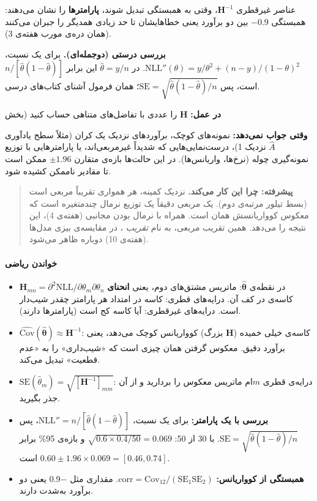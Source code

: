 عناصر غیرقطری \(\mathbf{H}^{-1}\)، وقتی به همبستگی تبدیل شوند،
\textbf{ پارامترها} را نشان می‌دهند: همبستگی 0.9\ensuremath{-} بین دو
برآورد یعنی خطاهایشان تا حد زیادی همدیگر را جبران می‌کنند (همان دره‌ی مورب
هفته‌ی 3).

\textbf{بررسی درستی (دوجمله‌ای).} برای یک نسبت،
\(\mathrm{NLL}''(\theta) = y/\theta^2 + (n-y)/(1-\theta)^2\). در
\(\hat\theta = y/n\) این برابر \(n / [\hat\theta(1-\hat\theta)]\) است،
پس \(\mathrm{SE} = \sqrt{\hat\theta(1-\hat\theta)/n}\)؛ همان فرمول آشنای
کتاب‌های درسی.

\textbf{در عمل:} \(\mathbf{H}\) را عددی با تفاضل‌های متناهی حساب کنید
(بخش 

\textbf{وقتی  جواب نمی‌دهد:} نمونه‌های کوچک، برآوردهای نزدیک یک
کران (مثلاً سطح یادآوری \(\hat A\) نزدیک 1)، درست‌نمایی‌هایی که شدیداً
غیرمربعی‌اند، یا پارامترهایی با توزیع نمونه‌گیری چوله (نرخ‌ها، واریانس‌ها).
در این حالت‌ها بازه‌ی متقارن \(\pm 1.96\)  ممکن است تا مقادیر
ناممکن کشیده شود.

\begin{quote}
\textbf{پیشرفته: چرا این کار می‌کند.} نزدیک کمینه، هر  همواری
تقریباً مربعی است (بسط تیلور مرتبه‌ی دوم). یک  مربعی دقیقاً
 یک توزیع نرمال چندمتغیره است که معکوس کوواریانسش همان
 است. همراه با نرمال بودن مجانبی  (هفته‌ی 4)، این
نتیجه را می‌دهد. همین تقریب مربعی، به نام \emph{تقریب }، در
مقایسه‌ی بیزی مدل‌ها (هفته‌ی 10) دوباره ظاهر می‌شود.
\end{quote}

\paragraph{خواندن ریاضی}

\begin{itemize}
\tightlist
\item
  \(\mathbf{H}_{mn} = \partial^2 \mathrm{NLL}/\partial\theta_m\partial\theta_n\)
  در نقطه‌ی \(\hat{\boldsymbol\theta}\): ماتریس مشتق‌های دوم، یعنی
  \textbf{انحنای} کاسه‌ی  در کف آن. درایه‌های قطری: کاسه در امتداد
  هر پارامتر چقدر شیب‌دار است. درایه‌های غیرقطری: آیا کاسه کج است
  (پارامترها  دارند).
\item
  \(\widehat{\mathrm{Cov}}(\hat{\boldsymbol\theta}) \approx \mathbf{H}^{-1}\):
  کاسه‌ی خیلی خمیده (\(\mathbf{H}\) بزرگ) کوواریانس کوچک می‌دهد، یعنی
  برآورد دقیق. معکوس گرفتن همان چیزی است که «شیب‌داری» را به «عدم قطعیت»
  تبدیل می‌کند.
\item
  \(\mathrm{SE}(\hat\theta_m) = \sqrt{[\mathbf{H}^{-1}]_{mm}}\): درایه‌ی
  قطری \(m\)ام ماتریس معکوس را بردارید و از آن جذر بگیرید.
\item
  \textbf{بررسی با یک پارامتر:} برای یک نسبت،
  \(\mathrm{NLL}'' = n/[\hat\theta(1-\hat\theta)]\)، پس
  \(\mathrm{SE} = \sqrt{\hat\theta(1-\hat\theta)/n}\). با 30 از 50:
  \(\sqrt{0.6 \times 0.4/50} = 0.069\) و بازه‌ی 95\% برابر
  \(0.60 \pm 1.96 \times 0.069 = [0.46,\allowbreak 0.74]\) است.
\item
  \textbf{همبستگی از کوواریانس:}
  \(\mathrm{corr} = \mathrm{Cov}_{12}/(\mathrm{SE}_1\mathrm{SE}_2)\).
  مقداری مثل \ensuremath{-}0.9 یعنی دو برآورد به‌شدت  دارند.
\end{itemize}

